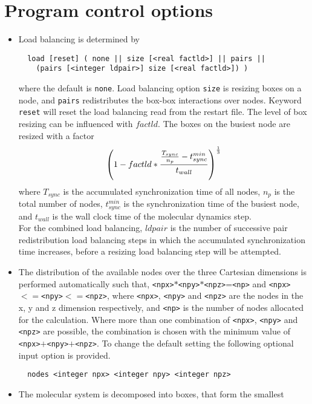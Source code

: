 \section{Program control options}
\begin{itemize}
\item
Load balancing is determined by
\begin{verbatim}
  load [reset] ( none || size [<real factld>] || pairs ||
	(pairs [<integer ldpair>] size [<real factld>]) )
\end{verbatim}
where the default is {\tt none}. Load balancing option {\tt size}
is resizing boxes on a node, and {\tt pairs} redistributes the
box-box interactions over nodes. Keyword \verb+reset+ will reset the
load balancing read from the restart file. The level of box resizing
can be influenced with $factld$. The boxes on the busiest node are
resized with a factor
\begin{equation}
 \left( 1 - factld * { {T_{sync} \over n_p} - t^{min}_{sync} \over t_{wall}}
\right)^{1\over 3}
\end{equation}
where $T_{sync}$ is the accumulated synchronization time of all nodes,
$n_p$ is the total number of nodes, $t^{min}_{sync}$ is the synchronization
time of the busiest node, and $t_{wall}$ is the wall clock time of the
molecular dynamics step.\\
For the combined load balancing, $ldpair$ is the number of successive pair 
redistribution load balancing steps in which the accumulated synchronization
time increases, before a resizing load balancing step will be attempted. 
\item
The distribution of the available nodes over the three Cartesian
dimensions is performed automatically such that, 
\verb+<npx>+$*$\verb+<npy>+$*$\verb+<npz>+=\verb+<np>+
and \verb+<npx>+$<=$\verb+<npy>+$<=$\verb+<npz>+, 
where \verb+<npx>+, \verb+<npy>+ and \verb+<npz>+ are the nodes in the
x, y and z dimension respectively, and \verb+<np>+ is the number of nodes
allocated for the calculation. Where more than one combination
of \verb+<npx>+, \verb+<npy>+ and \verb+<npz>+ are possible, the 
combination is chosen with the minimum value of 
\verb+<npx>+$+$\verb+<npy>+$+$\verb+<npz>+. To change the default setting
the following optional input option is provided.
\begin{verbatim}
  nodes <integer npx> <integer npy> <integer npz>
\end{verbatim}
\item
The molecular system is decomposed into boxes, that form the smallest

\end{itemize}
